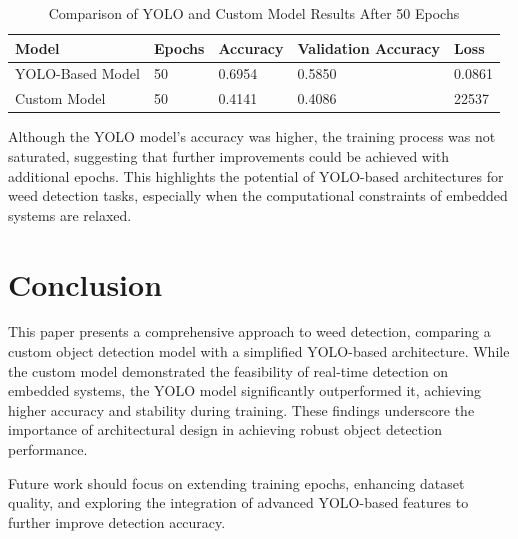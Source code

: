 \documentclass[conference]{IEEEtran}
\begin{document}
\begin{table}[H]
    \centering
    \caption{Comparison of YOLO and Custom Model Results After 50 Epochs}
    \label{tab:model_comparison}
    \begin{tabularx}{\columnwidth}{|l|X|X|X|X|}
    \hline
    \textbf{Model}        & \textbf{Epochs} & \textbf{Accuracy} & \textbf{Validation Accuracy} & \textbf{Loss}         \\ \hline
    YOLO-Based Model      & 50              & 0.6954            & 0.5850                       & 0.0861                \\ \hline
    Custom Model          & 50              & 0.4141            & 0.4086                       & 22537                 \\ \hline
    \end{tabularx}
\end{table}

Although the YOLO model's accuracy was higher, the training process was not saturated, suggesting that further improvements could be achieved with additional epochs. This highlights the potential of YOLO-based architectures for weed detection tasks, especially when the computational constraints of embedded systems are relaxed.


\section{Conclusion}
This paper presents a comprehensive approach to weed detection, comparing a custom object detection model with a simplified YOLO-based architecture. While the custom model demonstrated the feasibility of real-time detection on embedded systems, the YOLO model significantly outperformed it, achieving higher accuracy and stability during training. These findings underscore the importance of architectural design in achieving robust object detection performance.

Future work should focus on extending training epochs, enhancing dataset quality, and exploring the integration of advanced YOLO-based features to further improve detection accuracy.



\end{document}
